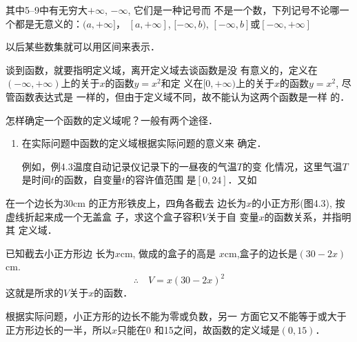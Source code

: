 其中5--9中有无穷大$+\infty$, $-\infty$, 它们是一种记号而
不是一个数，下列记号不论哪一个都是无意义的：$(a,+\infty]$，
$[a,+\infty]$, $[-\infty,b)$, $[-\infty,b]$或$[-\infty,+\infty]$

以后某些数集就可以用区间来表示．

谈到函数，就要指明定义域，离开定义域去谈函数是没
有意义的，定义在$(-\infty,+\infty)$上的关于$x$的函数$y=x^2$和定
义在$[0,+\infty)$上的关于$x$的函数$y=x^2$, 尽管函数表达式是
一样的，但由于定义域不同，故不能认为这两个函数是一样
的．

怎样确定一个函数的定义域呢？一般有两个途径．
\begin{enumerate}
    \item 在实际问题中函数的定义域根据实际问题的意义来
    确定．

    例如，例4.3温度自动记录仪记录下的一昼夜的气温$T$的变
    化情况，这里气温$T$是时间$t$的函数，自变量$t$的容许值范围
    是$[0,24]$．又如
\end{enumerate}

\begin{example}
 在一个边长为30cm
的正方形铁皮上，四角各截去
边长为$x$的小正方形(图4.3),
按虚线折起来成一个无盖盒
子，求这个盒子容积$V$关于自
变量$x$的函数关系，并指明其
定义域．   
\end{example}

\begin{figure}[htp]
    \centering
{}
    \caption{}
\end{figure}

\begin{solution}
    已知截去小正方形边
    长为$x$cm, 做成的盒子的高是
    $x$cm,盒子的边长是$(30-2x)$cm.
\[\therefore\quad     V=x(30-2x)^2\]
    这就是所求的$V$关于$x$的函数．

    根据实际问题，小正方形的边长不能为零或负数，另一
    方面它又不能等于或大于正方形边长的一半，所以$x$只能在0
    和15之间，故函数的定义域是$(0,15)$．
\end{solution}

